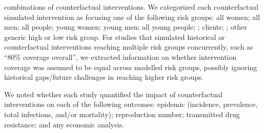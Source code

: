 combinations of counterfactual interventions.
We categorized each counterfactual simulated intervention as focusing one of the following risk groups:
all women; all men; all people; young women; young men; all young people;
\fsw; clients; \msm; other generic high or low risk group.
For studies that simulated historical or counterfactual interventions
reaching multiple risk groups concurrently,
such as ``80\% \art coverage overall'',
we extracted information on whether intervention coverage was assumed to be equal across modelled risk groups,  %
possibly ignoring historical gaps/future challenges in reaching higher risk groups. %
\par
We noted whether each study quantified the impact of counterfactual interventions
on each of the following outcomes:
\hiv epidemic (incidence, prevalence, total infections, and/or mortality);
reproduction number;
transmitted drug resistance; and
any economic analysis.
